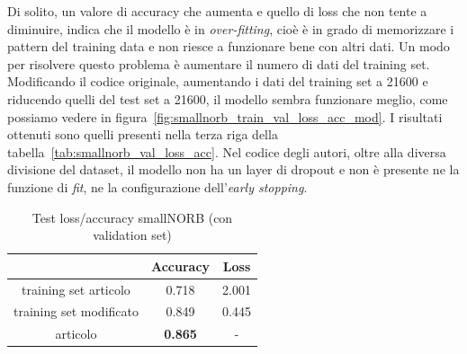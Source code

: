 \documentclass[italian,12pt,a4paper,oneside,final]{report}
\begin{document}
\noindent Di solito, un valore di accuracy che aumenta e quello di loss che non tente a diminuire, indica che il modello è in \textit{over-fitting}, cioè è in grado di memorizzare i pattern del training data e non riesce a funzionare bene con altri dati.
Un modo per risolvere questo problema è aumentare il numero di dati del training set.
Modificando il codice originale, aumentando i dati del training set a 21600 e riducendo quelli del test set a 21600, il modello sembra funzionare meglio, come possiamo vedere in figura~\ref{fig:smallnorb_train_val_loss_acc_mod}.
I risultati ottenuti sono quelli presenti nella terza riga della tabella~\ref{tab:smallnorb_val_loss_acc}.
Nel codice degli autori, oltre alla diversa divisione del dataset, il modello non ha un layer di dropout e non è presente ne la funzione di \textit{fit}, ne la configurazione dell'\textit{early stopping}.
\begin{table}[!ht]
	\centering
	\begin{tabular}[t]{|c|cc|}
		\hline
		& \textbf{Accuracy} & \textbf{Loss} \\
		\hline
		training set articolo& 0.718 & 2.001\\
		training set modificato& 0.849 & 0.445 \\
		articolo & \textbf{0.865} & - \\
		\hline
	\end{tabular}
	\caption{Test loss/accuracy smallNORB (con validation set)}
	\label{tab:smallnorb_val_loss_acc_pt}
\end{table}
\end{document}

